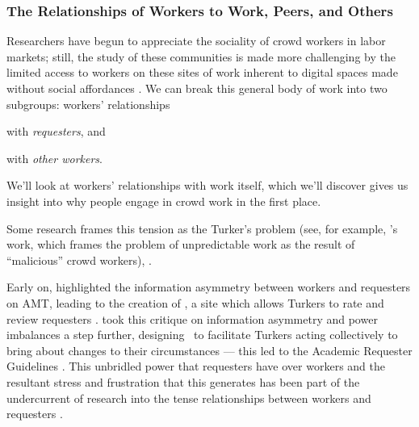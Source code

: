 \documentclass[trackingWork]{subfiles}
\begin{document}
\subsubsection[What will work and the place of work look like for workers]{The Relationships of Workers to Work, Peers, and Others}
\label{sec:relationships}

\subsubsubsection{\crowdworkpers}
Researchers have begun to appreciate
the sociality of crowd workers in labor markets;
still, the study of these communities is made more challenging by
the limited access to workers on these sites of work
inherent to digital spaces made without social affordances
\cite{crowdcollab,miller2011understanding}.
We can break this general body of work into two subgroups:
workers' relationships
\begin{inlinelist}
\item with \textit{requesters}, and
\item with \textit{other workers}.
\end{inlinelist}
We'll look at workers' relationships with work itself, which we'll discover
gives us insight into why people engage in crowd work in the first place.

Some research frames this tension as the Turker's problem
(see, for example, \citeauthor{MaliciousCrowdworkersGadiraju}'s work,
which frames the problem of unpredictable work as the result of ``malicious'' crowd workers),
\cite{MaliciousCrowdworkersGadiraju,Sheng:2008:GLI:1401890.1401965,Ipeirotis:2010:QMA:1837885.1837906}.

Early on, \citeauthor{turkopticon} highlighted
the information asymmetry between workers and requesters on AMT,
leading to the creation of \TO, a site which allows
Turkers to rate and review requesters
\cite{turkopticon}.
\citeauthor{dynamo} took this critique on information asymmetry and power imbalances a step further,
designing \DO~to facilitate
Turkers acting collectively to bring about changes to their circumstances
--- this led to the Academic Requester Guidelines
\cite{dynamo}.
This unbridled power that requesters have over workers and
the resultant stress and frustration that this generates
has been part of the undercurrent of research into
the tense relationships between workers and requesters
\cite{fixingChaos,dynamo}.
\end{document}
